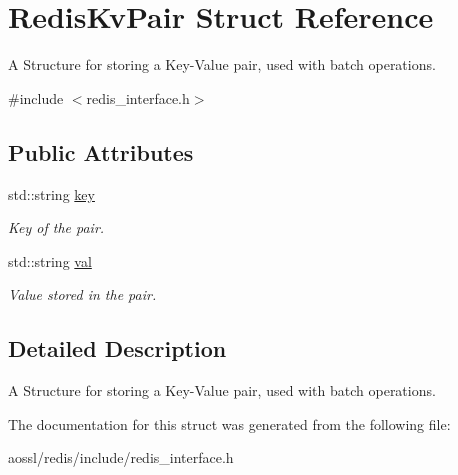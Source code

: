 \hypertarget{structRedisKvPair}{}\section{Redis\+Kv\+Pair Struct Reference}
\label{structRedisKvPair}


A Structure for storing a Key-\/\+Value pair, used with batch operations.  




{\ttfamily \#include $<$redis\+\_\+interface.\+h$>$}

\subsection*{Public Attributes}
\begin{DoxyCompactItemize}
\item 
std\+::string \hyperlink{structRedisKvPair_af3f52908debaab15e1ed092801d9a875}{key}\hypertarget{structRedisKvPair_af3f52908debaab15e1ed092801d9a875}{}\label{structRedisKvPair_af3f52908debaab15e1ed092801d9a875}

\begin{DoxyCompactList}\small\item\em Key of the pair. \end{DoxyCompactList}\item 
std\+::string \hyperlink{structRedisKvPair_a4d376aa2e230347adc28ac942e3da043}{val}\hypertarget{structRedisKvPair_a4d376aa2e230347adc28ac942e3da043}{}\label{structRedisKvPair_a4d376aa2e230347adc28ac942e3da043}

\begin{DoxyCompactList}\small\item\em Value stored in the pair. \end{DoxyCompactList}\end{DoxyCompactItemize}


\subsection{Detailed Description}
A Structure for storing a Key-\/\+Value pair, used with batch operations. 

The documentation for this struct was generated from the following file\+:\begin{DoxyCompactItemize}
\item 
aossl/redis/include/redis\+\_\+interface.\+h\end{DoxyCompactItemize}
